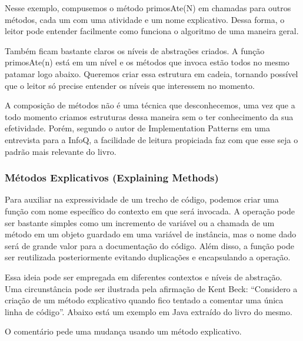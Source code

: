 

Nesse exemplo, compusemos o método primosAte(N) em chamadas para outros métodos, cada um com uma atividade e um nome explicativo. Dessa forma, o leitor pode entender facilmente como funciona o algoritmo de uma maneira geral. 
	
Também ficam bastante claros os níveis de abstrações criados. A função primosAte(n) está em um nível e os métodos que invoca estão todos no mesmo patamar logo abaixo. Queremos criar essa estrutura em cadeia, tornando possível que o leitor só precise entender os níveis que interessem no momento.
	
A composição de métodos não é uma técnica que desconhecemos, uma vez que a todo momento criamos estruturas dessa maneira sem o ter conhecimento da sua efetividade. Porém, segundo o autor de Implementation Patterns em uma entrevista para a InfoQ, a facilidade de leitura propiciada faz com que esse seja o padrão mais relevante do livro. 	

\subsubsection{Métodos Explicativos (Explaining Methods)}
Para auxiliar na expressividade de um trecho de código, podemos criar uma função com nome específico do contexto em que será invocada. A operação pode ser bastante simples como um incremento de variável ou a chamada de um método em um objeto guardado em uma variável de instância, mas o nome dado será de grande valor para a documentação do código. Além disso, a função pode ser reutilizada posteriormente evitando duplicações e encapsulando a operação.
	
Essa ideia pode ser empregada em diferentes contextos e níveis de abstração. Uma circunstância pode ser ilustrada pela afirmação de Kent Beck: “Considero a criação de um método explicativo quando fico tentado a comentar uma única linha de código”. Abaixo está um exemplo em Java extraído do livro do mesmo.



O comentário pede uma mudança usando um método explicativo.
	


